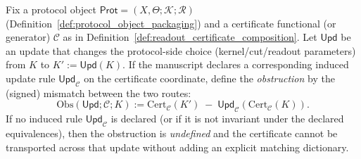 \begin{definition}\label{def:obstruction_functional}
\AuditTag Fix a protocol object $\mathsf{Prot}=(X,\Theta;\mathcal{K};\mathcal{R})$ (Definition~\ref{def:protocol_object_packaging})
and a certificate functional (or generator) $\mathcal{C}$ as in Definition~\ref{def:readout_certificate_composition}.
Let $\mathsf{Upd}$ be an update that changes the protocol-side choice (kernel/cut/readout parameters) from $K$ to $K':=\mathsf{Upd}(K)$.
\AuditTag If the manuscript declares a corresponding induced update rule $\mathsf{Upd}_{\mathcal{C}}$ on the certificate coordinate,
define the \emph{obstruction} by the (signed) mismatch between the two routes:
\[
\mathrm{Obs}(\mathsf{Upd};\mathcal{C};K)
:=
\mathrm{Cert}_{\mathcal{C}}(K')\;-\;\mathsf{Upd}_{\mathcal{C}}(\mathrm{Cert}_{\mathcal{C}}(K)).
\]
\AuditTag If no induced rule $\mathsf{Upd}_{\mathcal{C}}$ is declared (or if it is not invariant under the declared equivalences),
then the obstruction is \emph{undefined} and the certificate cannot be transported across that update without adding an explicit matching dictionary.
\end{definition}


